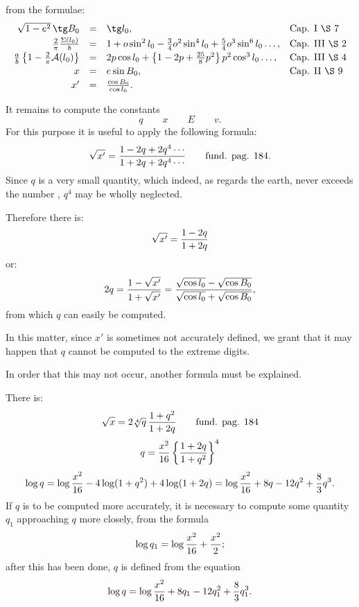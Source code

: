 \begingroup\small
from the formulae:
\[
\begin{array}{rcll}
 \sqrt{1-e^2}\,\tg B_0&=&\tg l_0, &\text{Cap. I \S\ 7}\vspace{0.2em}\\
 {2\over\pi}{\Sigma(l_0)\over b}&=&1+o\sin^2l_0-{3\over4}o^2\sin^4l_0+{5\over4}o^3\sin^6l_0\ldots, &\text{Cap. III \S\ 2}\vspace{0.2em}\\
 {a\over b}\left\{1-{2\over\pi}\mathcal A(l_0)\right\}&=&2p\cos l_0+\left\{1-2p+{25\over8}p^2\right\}p^2\cos^3l_0\ldots, &\text{Cap. III \S\ 4}\vspace{0.2em}\\
 x&=&e\sin B_0, &\text{Cap. II \S\ 9}\vspace{0.2em}\\
 x'&=&{\cos B_0\over \cos l_0}. &
\end{array}
\]


It remains to compute the constants
\[
 q\qquad x\qquad E\qquad v.
\]
For this purpose it is useful to apply the following formula:
\[
 \sqrt{x'}={1-2q+2q^4\cdots\over 1+2q+2q^4\cdots}\qquad \text{fund. pag. 184.}
\]
Since $q$ is a very small quantity, which indeed, as regards the earth, never exceeds the number , $q^4$ may be wholly neglected.

Therefore there is:
\[
 \sqrt{x'}={1-2q\over 1+2q}
\]
or:
\[
 2q={1-\sqrt{x'}\over 1+\sqrt{x'}}
 ={\sqrt{\cos l_0}-\sqrt{\cos B_0}\over \sqrt{\cos l_0}+\sqrt{\cos B_0}},
\]
from which $q$ can easily be computed.

In this matter, since $x'$ is sometimes not accurately defined, we grant that it may happen that $q$ cannot be computed to the extreme digits.

In order that this may not occur, another formula must be explained.

There is:
\[
 \sqrt{x}=2\sqrt[4]{q}\,{1+q^2\over 1+2q}
 \qquad \text{fund. pag. 184}
\]
\[
 q={x^2\over16}\left\{{1+2q\over 1+q^2}\right\}^{4}
\]
\[
 \log q=\log{x^2\over16}-4\log(1+q^2)+4\log(1+2q)
 =\log{x^2\over16}+8q-12q^2+{8\over3}q^3.
\]
If $q$ is to be computed more accurately, it is necessary to compute some quantity $q_1$ approaching $q$ more closely, from the formula
\[
 \log q_1=\log{x^2\over16}+{x^2\over2};
\]
after this has been done, $q$ is defined from the equation
\[
 \log q=\log{x^2\over16}+8q_1-12q_1^2+{8\over3}q_1^3.
\]
\endgroup
